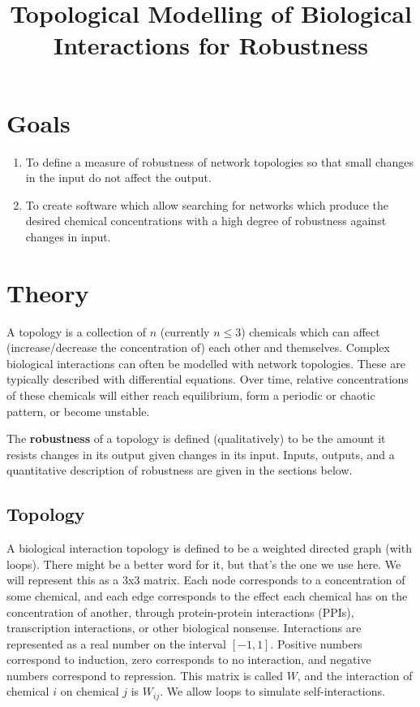 \documentclass{article}
\title{Topological Modelling of Biological Interactions for Robustness}
\date{}
\begin{document}
\maketitle
\vspace{-50pt}

\section{Goals}
\begin{enumerate}
\item To define a measure of robustness of network topologies so that small changes in the input do not affect the output.
\item To create software which allow searching for networks which produce the desired chemical concentrations with a high degree of robustness against changes in input.
\end{enumerate}

\section{Theory}
A topology is a collection of $n$ (currently $n \le 3$) chemicals which can affect (increase/decrease the concentration of) each other and themselves. Complex biological interactions can often be modelled with network topologies. These are typically described with differential equations. Over time, relative concentrations of these chemicals will either reach equilibrium, form a periodic or chaotic pattern, or become unstable.

The \textbf{robustness} of a topology is defined (qualitatively) to be the amount it resists changes in its output given changes in its input. Inputs, outputs, and a quantitative description of robustness are given in the sections below.

\subsection{Topology} \label{topology-weights}
A biological interaction topology is defined to be a weighted directed graph (with loops). There might be a better word for it, but that's the one we use here. We will represent this as a 3x3 matrix. Each node corresponds to a concentration of some chemical, and each edge corresponds to the effect each chemical has on the concentration of another, through protein-protein interactions (PPIs), transcription interactions, or other biological nonsense. Interactions are represented as a real number on the interval $[-1,1]$. Positive numbers correspond to induction, zero corresponds to no interaction, and negative numbers correspond to repression. This matrix is called $W$, and the interaction of chemical $i$ on chemical $j$ is $W_{ij}$. We allow loops to simulate self-interactions.
\end{document}
